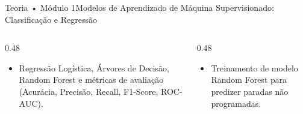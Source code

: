 \begin{senaiframe}{Teoria • Módulo 1}{Modelos de Aprendizado de Máquina Supervisionado: Classificação e Regressão}
  \begin{columns}[t]
    \begin{column}{0.48\textwidth}
      \begin{tcolorbox}[senaibluecard, title={Fundamentos Teóricos}]
        \begin{itemize}
          \item Regressão Logística, Árvores de Decisão, Random Forest e métricas de avaliação (Acurácia, Precisão, Recall, F1-Score, ROC-AUC).
        \end{itemize}
      \end{tcolorbox}
    \end{column}
    \begin{column}{0.48\textwidth}
      \begin{tcolorbox}[senaigreencard, title={Prática \& Laboratório}]
        \begin{itemize}
          \item Treinamento de modelo Random Forest para predizer paradas não programadas.
        \end{itemize}
      \end{tcolorbox}
    \end{column}
  \end{columns}
\end{senaiframe}
